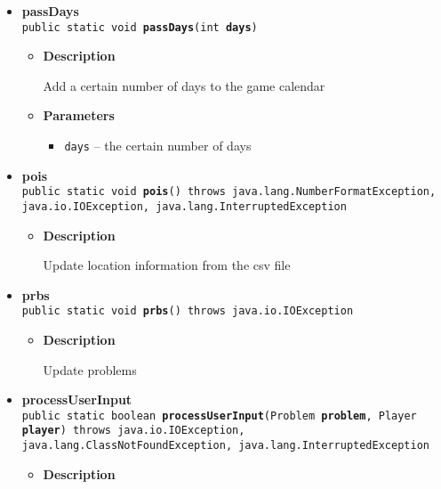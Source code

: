 {{{\begin{itemize}
{\begin{itemize}
{Add 1 day to the calendar
}
\end{itemize}
}%
\item{ 
{\bf  passDays}\\
\texttt{public static void\ {\bf  passDays}(\texttt{int} {\bf  days})
\label{personOfInterest.Game.passDays(int)}}%
\begin{itemize}
\item{
{\bf  Description}

Add a certain number of days to the game calendar
}
\item{
{\bf  Parameters}
  \begin{itemize}
   \item{
\texttt{days} -- the certain number of days}
  \end{itemize}
}%
\end{itemize}
}%
\item{ 
{\bf  pois}\\
\texttt{public static void\ {\bf  pois}() throws java.lang.NumberFormatException, java.io.IOException, java.lang.InterruptedException
\label{personOfInterest.Game.pois()}}%
\begin{itemize}
\item{
{\bf  Description}

Update location information from the csv file
}
\end{itemize}
}%
\item{ 
{\bf  prbs}\\
\texttt{public static void\ {\bf  prbs}() throws java.io.IOException
\label{personOfInterest.Game.prbs()}}%
\begin{itemize}
\item{
{\bf  Description}

Update problems
}
\end{itemize}
}%
\item{ 
{\bf  processUserInput}\\
\texttt{public static boolean\ {\bf  processUserInput}(\texttt{Problem} {\bf  problem},
\texttt{Player} {\bf  player}) throws java.io.IOException, java.lang.ClassNotFoundException, java.lang.InterruptedException
\label{personOfInterest.Game.processUserInput(personOfInterest.Problem, personOfInterest.Player)}}%
\begin{itemize}
\item{
{\bf  Description}

}
\end{itemize}}
\end{itemize}}}}
